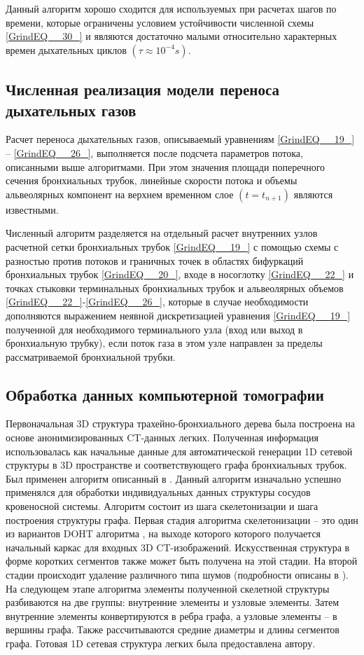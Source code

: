 Данный алгоритм хорошо сходится для используемых при расчетах шагов по времени, которые ограничены условием устойчивости численной схемы \eqref{GrindEQ__30_} и являются достаточно малыми относительно характерных времен дыхательных циклов $\left(\tau \approx 10^{-4} s\right)$.

\subsection{Численная реализация модели переноса дыхательных газов}
Расчет переноса дыхательных газов, описываемый уравнениям \eqref{GrindEQ__19_} -- \eqref{GrindEQ__26_}, выполняется после подсчета параметров потока, описанными выше алгоритмами. При этом значения площади поперечного сечения бронхиальных трубок, линейные скорости потока и объемы альвеолярных компонент на верхнем временном слое $\left(t=t_{n+1} \right)$ являются известными. 

Численный алгоритм разделяется на отдельный расчет внутренних узлов расчетной сетки бронхиальных трубок \eqref{GrindEQ__19_} с помощью схемы с разностью против потоков и граничных точек в областях бифуркаций бронхиальных трубок \eqref{GrindEQ__20_}, входе в носоглотку \eqref{GrindEQ__22_} и точках стыковки терминальных бронхиальных трубок и альвеолярных объемов \eqref{GrindEQ__22_}-\eqref{GrindEQ__26_}, которые в случае необходимости дополняются выражением неявной дискретизацией уравнения \eqref{GrindEQ__19_} полученной для необходимого терминального узла (вход или выход в бронхиальную трубку), если поток газа в этом узле направлен за пределы рассматриваемой бронхиальной трубки.

\subsection{Обработка данных компьютерной томографии}
Первоначальная 3D структура трахейно-бронхиального дерева была построена на основе анонимизированных CT-данных легких. Полученная информация использовалась как начальные данные для автоматической генерации 1D сетевой структуры в 3D пространстве и соответствующего графа бронхиальных трубок. Был применен алгоритм описанный в \cite{Danilov2016}. Данный алгоритм изначально успешно применялся для обработки индивидуальных данных структуры сосудов кровеносной системы. Алгоритм состоит из шага скелетонизации и шага построения структуры графа. Первая стадия алгоритма скелетонизации – это один из вариантов DOHT алгоритма \cite{Pudney1998}, на выходе которого которого получается начальный каркас для входных 3D CT-изображений. Искусственная структура в форме коротких сегментов также может быть получена на этой стадии. На второй стадии происходит удаление различного типа шумов (подробности описаны в \cite{Danilov2016}). На следующем этапе алгоритма элементы полученной скелетной структуры разбиваются на две группы: внутренние элементы и узловые элементы. Затем внутренние элементы конвертируются в ребра графа, а узловые элементы – в вершины графа. Также рассчитываются средние диаметры и длины сегментов графа. Готовая 1D сетевая структура легких была предоставлена автору. 

